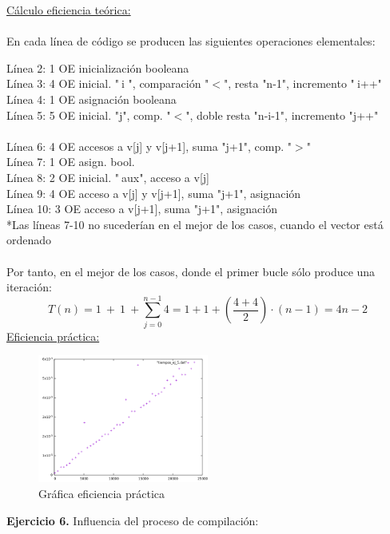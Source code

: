 \documentclass[titlepage, 12pt,a4paper]{article}
\begin{document}
\underline{Cálculo eficiencia teórica:}
\\\\
En cada línea de código se producen las siguientes operaciones elementales:

Línea 2: 1 OE inicialización booleana\\
Línea 3: 4 OE inicial. "$\ $i ", comparación "$<$", resta "n-1", incremento "$\ $i++"\\
Línea 4: 1 OE asignación booleana\\
Línea 5: 5 OE inicial. "j", comp. "$<$", doble resta "n-i-1", incremento "j++"\\\\
Línea 6: 4 OE accesos a v[j] y v[j+1], suma "j+1", comp. "$>$"\\
Línea 7: 1 OE asign. bool.\\
Línea 8: 2 OE inicial. "$\ $aux", acceso a v[j]\\
Línea 9: 4 OE acceso a v[j] y v[j+1], suma "j+1", asignación\\
Línea 10: 3 OE acceso a v[j+1], suma "j+1", asignación\\

*Las líneas 7-10 no sucederían en el mejor de los casos, cuando el vector está ordenado
\ 
\\\\ 
Por tanto, en el mejor de los casos, donde el primer bucle sólo produce una iteración:\\ 
$$T(n)=1\ +\ 1\ +\sum \limits_{j=0}^{n-1} 4= 1+1+(\frac{4+4}{2})\cdot(n-1)= 4n-2 $$
\newpage
\underline{Eficiencia práctica:}\\

\begin{figure}[!ht]
  \caption{Gráfica eficiencia práctica}
  \centering
    \includegraphics[width=0.5\textwidth]{./img/ef_pract_ej_5.png}
\end{figure}
\newpage


\textbf{\large Ejercicio 6.} Influencia del proceso de compilación:\\
\end{document}
